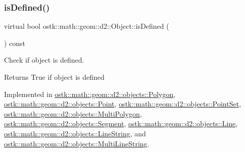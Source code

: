 \subsubsection{\texorpdfstring{is\+Defined()}{isDefined()}}
{\footnotesize\ttfamily virtual bool ostk\+::math\+::geom\+::d2\+::\+Object\+::is\+Defined (\begin{DoxyParamCaption}{ }\end{DoxyParamCaption}) const\hspace{0.3cm}{\ttfamily [pure virtual]}}



Check if object is defined. 

\begin{DoxyReturn}{Returns}
True if object is defined 
\end{DoxyReturn}


Implemented in \hyperlink{classostk_1_1math_1_1geom_1_1d2_1_1objects_1_1_polygon_a81f92393dad2c6421fd4fe3834f60fa2}{ostk\+::math\+::geom\+::d2\+::objects\+::\+Polygon}, \hyperlink{classostk_1_1math_1_1geom_1_1d2_1_1objects_1_1_point_a245dd2f0268e1f162804489ac911cb0c}{ostk\+::math\+::geom\+::d2\+::objects\+::\+Point}, \hyperlink{classostk_1_1math_1_1geom_1_1d2_1_1objects_1_1_point_set_a6b2dd586eeb7f4fbf659fa9810574315}{ostk\+::math\+::geom\+::d2\+::objects\+::\+Point\+Set}, \hyperlink{classostk_1_1math_1_1geom_1_1d2_1_1objects_1_1_multi_polygon_a27e84e80acbae4c2a7436a4d5c07b576}{ostk\+::math\+::geom\+::d2\+::objects\+::\+Multi\+Polygon}, \hyperlink{classostk_1_1math_1_1geom_1_1d2_1_1objects_1_1_segment_a4e7397f14fd36b0aecd7afddd4fddf84}{ostk\+::math\+::geom\+::d2\+::objects\+::\+Segment}, \hyperlink{classostk_1_1math_1_1geom_1_1d2_1_1objects_1_1_line_a1e2a44eac16df2d9009eebf3aa85afd2}{ostk\+::math\+::geom\+::d2\+::objects\+::\+Line}, \hyperlink{classostk_1_1math_1_1geom_1_1d2_1_1objects_1_1_line_string_a0fd7edff5727e1373dbea759313313cc}{ostk\+::math\+::geom\+::d2\+::objects\+::\+Line\+String}, and \hyperlink{classostk_1_1math_1_1geom_1_1d2_1_1objects_1_1_multi_line_string_a446d9d1344336d6ec8b2ff1e46629ca2}{ostk\+::math\+::geom\+::d2\+::objects\+::\+Multi\+Line\+String}.

\mbox{\label{classostk_1_1math_1_1geom_1_1d2_1_1_object_a10e035f09ac34d04901485d494681ff6}} 
